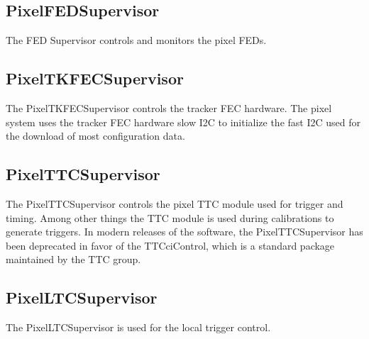 \subsection{PixelFEDSupervisor}
The FED Supervisor controls and monitors the pixel FEDs.

\subsection{PixelTKFECSupervisor}
The PixelTKFECSupervisor controls the tracker FEC hardware. The
pixel system uses the tracker FEC hardware slow I2C to
initialize the fast I2C used for the download of most 
configuration data.

\subsection{PixelTTCSupervisor}
The PixelTTCSupervisor controls the pixel TTC module used for trigger
and timing. Among other things the TTC module is used during
calibrations to generate triggers. In modern releases of the software,
the PixelTTCSupervisor has been deprecated in favor of the
TTCciControl, which is a standard package maintained by the TTC group.

\subsection{PixelLTCSupervisor}
The PixelLTCSupervisor is used for the local trigger control.

